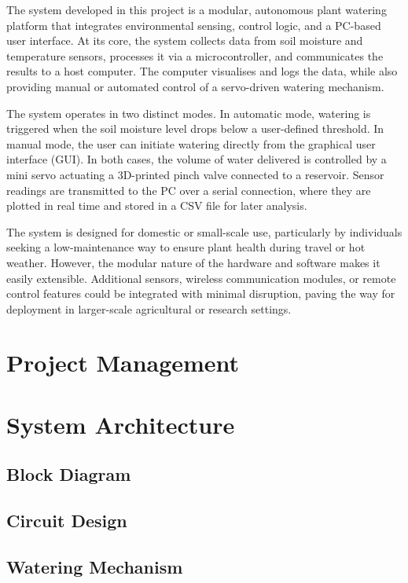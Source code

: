 \documentclass[a4paper,11pt]{article}
\begin{document}
The system developed in this project is a modular, 
autonomous plant watering platform that integrates environmental sensing, 
control logic, and a PC-based user interface. 
At its core, the system collects data from soil moisture and temperature sensors, 
processes it via a microcontroller, and communicates the results to a host computer. 
The computer visualises and logs the data, while also providing manual 
or automated control of a servo-driven watering mechanism.

The system operates in two distinct modes. 
In automatic mode, watering is triggered when the soil moisture level drops 
below a user-defined threshold. 
In manual mode, the user can initiate watering directly from the graphical user interface (GUI). 
In both cases, the volume of water delivered is controlled 
by a mini servo actuating a 3D-printed pinch valve connected to a reservoir. 
Sensor readings are transmitted to the PC over a serial connection, 
where they are plotted in real time and stored in a CSV file for later analysis.

The system is designed for domestic or small-scale use, 
particularly by individuals seeking a low-maintenance way to 
ensure plant health during travel or hot weather. 
However, the modular nature of the hardware and software makes it easily extensible. 
Additional sensors, wireless communication modules, 
or remote control features could be integrated with minimal disruption, 
paving the way for deployment in larger-scale agricultural or research settings.

\section{Project Management}
\label{sec:project_management}

\section{System Architecture}
\label{sec:architecture}
\subsection{Block Diagram}
\label{sec:block_diagram}
\subsection{Circuit Design}
\label{sec:circuit_design}
\subsection{Watering Mechanism}
\label{sec:water_system}
\end{document}
